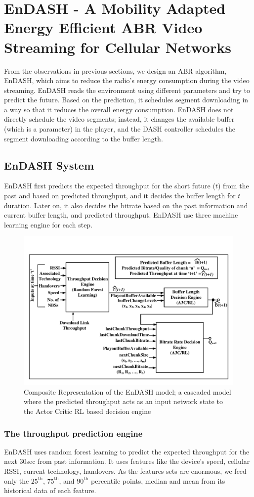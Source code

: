\section{EnDASH - A Mobility Adapted Energy Efficient ABR Video Streaming for Cellular Networks}
From the observations in previous sections, we design an ABR algorithm, EnDASH, which aims to reduce the radio's energy consumption during the video streaming. EnDASH reads the environment using different parameters and try to predict the future. Based on the prediction, it schedules segment downloading in a way so that it reduces the overall energy consumption. EnDASH does not directly schedule the video segments; instead, it changes the available buffer (which is a parameter) in the player, and the DASH controller schedules the segment downloading according to the buffer length.
\subsection{EnDASH System}
EnDASH first predicts the expected throughput for the short future ($t$) from the past and based on predicted throughput, and it decides the buffer length for $t$ duration. Later on, it also decides the bitrate based on the past information and current buffer length, and predicted throughput. EnDASH use three machine learning engine for each step.

\begin{figure}[!h]
	\centering
	\includegraphics[width=0.7\linewidth]{img/EnDASH/EnDASH_system}
	\caption{Composite Representation of the EnDASH model; a cascaded model where the predicted throughput acts as an input network state to the Actor Critic RL based decision
		engine}
	\label{fig:endash:system}
\end{figure}

\subsubsection{The throughput prediction engine}
EnDASH uses random forest learning to predict the expected throughput for the next 30sec from past information. It uses features like the device's speed, cellular RSSI, current technology, handovers. As the features sets are enormous, we feed only the $\mathrm{25^{th}}$, $\mathrm{75^{th}}$, and $\mathrm{90^{th}}$ percentile points, median and mean from its historical data of each feature.
